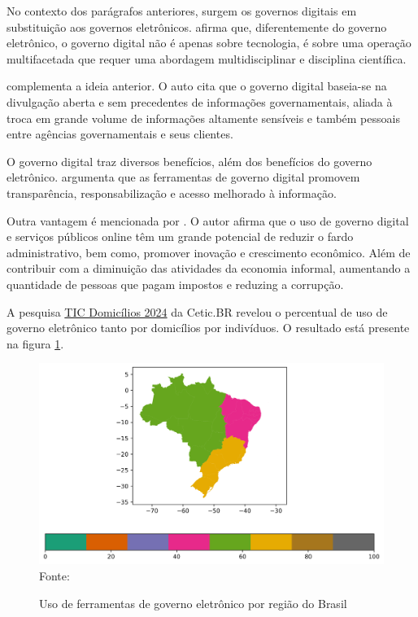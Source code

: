 No contexto dos parágrafos anteriores, surgem os governos digitais em substituição aos governos eletrônicos. \cite{veiga2016digital} afirma que, diferentemente do governo eletrônico, o governo digital não é apenas sobre tecnologia, é sobre uma operação multifacetada  que requer uma abordagem multidisciplinar e disciplina científica. 

\cite{bounabat2017government} complementa a ideia anterior. O auto cita que o governo digital baseia-se na divulgação aberta e sem precedentes de informações governamentais, aliada à troca em grande volume de informações altamente sensíveis e também pessoais entre agências governamentais e seus clientes. 

O governo digital traz diversos benefícios, além dos benefícios do governo eletrônico. \cite{martins2018war} argumenta que as ferramentas de governo digital promovem transparência, responsabilização e acesso melhorado à informação.

Outra vantagem é mencionada por \cite{veiga2016digital}. O autor afirma que o uso de governo digital e serviços públicos online têm um grande potencial de reduzir o fardo administrativo, bem como, promover inovação e crescimento econômico. Além de contribuir com a diminuição das atividades da economia informal, aumentando a quantidade de pessoas que pagam impostos e reduzing a corrupção.

A pesquisa \href{https://cetic.br/pt/pesquisa/domicilios/}{TIC Domicílios 2024} da Cetic.BR revelou o percentual de uso de governo eletrônico tanto por domicílios por indivíduos. O resultado está presente na figura \ref{fig:mapa_coropleto_paises_uso_egov_regioes}.

\begin{figure}[H]
	\centering
	\caption{Uso de ferramentas de governo eletrônico por região do Brasil}
	\includegraphics[width=1\linewidth]{figuras/mapa_coropleto_paises_uso_egov_regioes}
	\label{fig:mapa_coropleto_paises_uso_egov_regioes}
	\footnotesize{Fonte: \cite{tic_domicilios_2024_g1}}
\end{figure}
